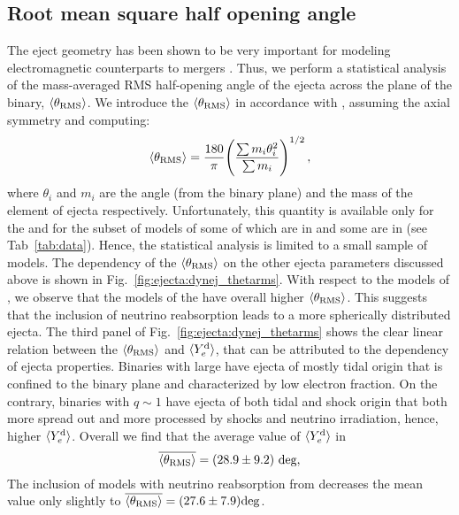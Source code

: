 
\subsection{Root mean square half opening angle} 

The eject geometry has been shown to be very important for modeling electromagnetic 
counterparts to mergers \citep[\eg][]{Perego:2017wtu}. 
Thus, we perform a statistical analysis of the mass-averaged \ac{RMS} half-opening 
angle of the ejecta across the plane of the binary, $\langle\theta_{\rm RMS}\rangle$.
We introduce the $\langle\theta_{\rm RMS}\rangle$ in accordance with \citet{Radice:2018pdn}, assuming 
the axial symmetry and computing:
%
\begin{equation}
\langle\theta_{\rm RMS}\rangle = \frac{180}{\pi}\Bigg(\frac{\sum m_i \theta_i^2}{\sum m_i}\Bigg)^{1/2}\, ,
\end{equation}
%
where $\theta_i$ and $m_i$ are the angle (from the binary plane) and the mass of 
the element of ejecta respectively.
%
Unfortunately, this quantity is available only for the \DSrefset{} and for the subset 
of models of \citet{Radice:2018pdn} some of which are in \DScool{} and some are in 
\DSheatcool{} (see Tab~\ref{tab:data}). Hence, the statistical analysis is limited 
to a small sample of models. The dependency of the $\langle\theta_{\rm RMS}\rangle$ on the other ejecta 
parameters discussed above is shown in Fig.~\ref{fig:ejecta:dynej_thetarms}.
%
With respect to the models of \citet{Radice:2018pdn}, we observe that the models of the 
\DSrefset{} have overall higher $\langle\theta_{\rm RMS}\rangle$. This suggests that the inclusion of 
neutrino reabsorption leads to a more spherically distributed ejecta.
%
The third panel of Fig.~\ref{fig:ejecta:dynej_thetarms} shows the clear linear relation 
between the $\langle\theta_{\rm RMS}\rangle$ and $\langle Y^{\text{d}}_{e}\rangle$, that can be attributed to the \mr{} dependency of 
ejecta properties. Binaries with large \mr{} have ejecta of mostly tidal origin that 
is confined to the binary plane and characterized by low electron fraction. On the 
contrary, binaries with $q\sim 1$ have ejecta of both tidal and shock origin that both 
more spread out and more processed by shocks and neutrino irradiation, hence, higher $\langle Y^{\text{d}}_{e}\rangle$.
%
Overall we find that the average value of $\langle Y^{\text{d}}_{e}\rangle$ in \DSrefset{}
%
\begin{equation}
\overline{\langle\theta_{\rm RMS}\rangle} = (28.9 \pm 9.2)~\text{deg},
\end{equation}
%
The inclusion of models with neutrino reabsorption from \citet{Radice:2018pdn} decreases 
the mean value only slightly to $\overline{\langle\theta_{\rm RMS}\rangle}=(27.6 \pm 7.9) \text{deg}$.


